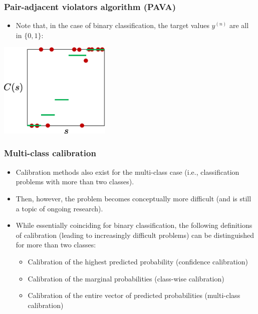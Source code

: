 \documentclass[11pt,compress,t,notes=noshow, xcolor=table]{beamer}
\begin{document}
\begin{frame}[t]
	\frametitle{Pair-adjacent violators algorithm (PAVA)}
	
	\begin{itemize}
		\item Note that, in the case of binary classification, the target values $y^{(n)}$ are all in $\{ 0, 1 \}$:
	\end{itemize}
	
	\medskip 
	
	\begin{center}
		\includegraphics[width=0.4\textwidth]{figure/pic-pava2}
		
	\end{center}
\end{frame}


\begin{frame}[t]
	\frametitle{Multi-class calibration}
	
	\begin{itemize}
		\item Calibration methods also exist for the multi-class case (i.e., classification problems with more than two classes).
		\item Then, however, the problem becomes conceptually more difficult (and is still a topic of ongoing research).
		\item 
		While essentially coinciding for binary classification, the following definitions of calibration (leading to increasingly difficult problems) can be distinguished for more than two classes:
		\begin{itemize}
			\item Calibration of the highest predicted probability (confidence calibration) 
			\item Calibration of the marginal probabilities (class-wise calibration)
			\item Calibration of the entire vector of predicted probabilities (multi-class calibration)
		\end{itemize}
	\end{itemize}
\end{frame}

%
\endlecture
\end{document}
